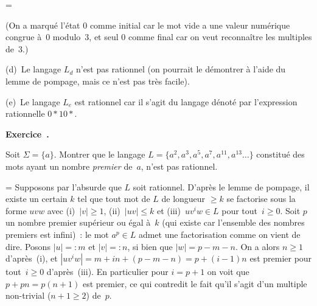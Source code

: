\documentclass[12pt,a4paper]{article}
\theoremstyle{definition}
\newcommand\exercice{%
\refstepcounter{comcnt}\bigskip\noindent\textbf{Exercice~\thecomcnt.}}
\newif\ifcorrige
\newenvironment{corrige}%
{\ifcorrige\relax\else\setbox0=\vbox\bgroup\fi%
\smallbreak\footnotesize\noindent{\underbar{\textit{Corrigé.}}\quad}}
{{\hbox{}\nobreak\hfill\checkmark}%
\ifcorrige\relax\else\egroup\fi\par}
\begin{document}
\begin{corrige}
\begin{center}

\end{center}
(On a marqué l'état $0$ comme initial car le mot vide a une valeur
numérique congrue à $0$ modulo $3$, et seul $0$ comme final car on
veut reconnaître les multiples de $3$.)

(d) Le langage $L_d$ n'est pas rationnel (on pourrait le démontrer à
l'aide du lemme de pompage, mais ce n'est pas très facile).

(e) Le langage $L_e$ est rationnel car il s'agit du langage dénoté par
l'expression rationnelle $0{*}10{*}$.
\end{corrige}

%

\exercice

Soit $\Sigma = \{a\}$.  Montrer que le langage $L = \{a^2, a^3, a^5,
a^7, a^{11}, a^{13}\ldots\}$ constitué des mots ayant un nombre
\emph{premier} de $a$, n'est pas rationnel.

\begin{corrige}
Supposons par l'absurde que $L$ soit rationnel.  D'après le lemme de
pompage, il existe un certain $k$ tel que tout mot de $L$ de longueur
$\geq k$ se factorise sous la forme $uvw$ avec (i) $|v|\geq 1$,
(ii) $|uv|\leq k$ et (iii) $uv^iw \in L$ pour tout $i\geq 0$.  Soit
$p$ un nombre premier supérieur ou égal à $k$ (qui existe car
l'ensemble des nombres premiers est infini) : le mot $a^p \in L$
admet une factorisation comme on vient de dire.  Posons $|u| =: m$ et
$|v| =: n$, si bien que $|w| = p-m-n$.  On a alors $n\geq 1$
d'après (i), et $|uv^iw| = m + in + (p-m-n) = p+(i-1)n$ est premier
pour tout $i\geq 0$ d'après (iii).  En particulier pour $i=p+1$ on
voit que $p + pn = p(n+1)$ est premier, ce qui contredit le fait qu'il
s'agit d'un multiple non-trivial ($n+1\geq 2$) de $p$.
\end{corrige}
\end{document}
